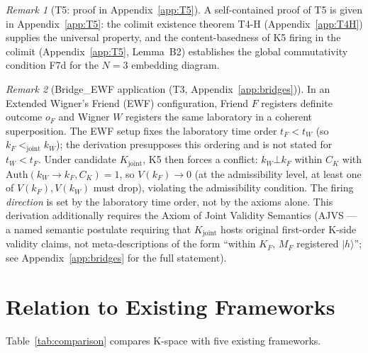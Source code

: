 \documentclass[12pt,a4paper]{article}
\theoremstyle{plain}
\theoremstyle{definition}
\theoremstyle{remark}
\newtheorem{remark}{Remark}[section]
\newcommand{\Kjoint}{K_{\mathrm{joint}}}
\newcommand{\CK}{C_K}
\newcommand{\Auth}{\mathrm{Auth}}
\begin{document}
\begin{remark}[T5: proof in Appendix~\ref{app:T5}]
A self-contained proof of T5 is given in Appendix~\ref{app:T5}: the colimit
existence theorem T4-H (Appendix~\ref{app:T4H}) supplies the universal
property, and the content-basedness of K5 firing in the colimit
(Appendix~\ref{app:T5}, Lemma~B2) establishes the global commutativity
condition F7d for the $N=3$ embedding diagram.
\end{remark}

\begin{remark}[Bridge\_EWF application (T3, Appendix~\ref{app:bridges})]
In an Extended Wigner's Friend (EWF) configuration, Friend $F$ registers
definite outcome $o_F$ and Wigner $W$ registers the same laboratory in a
coherent superposition. The EWF setup fixes the laboratory time order
$t_F < t_W$ (so $k_F <_{\mathrm{joint}} k_W$); the derivation presupposes this
ordering and is not stated for $t_W < t_F$. Under candidate $\Kjoint$, K5 then
forces a conflict: $k_W \bot k_F$ within $\CK$ with $\Auth(k_W\to k_F, \CK)=1$,
so $V(k_F)\to 0$ (at the admissibility level, at least one of $V(k_F), V(k_W)$
must drop), violating the admissibility condition. The firing \emph{direction}
is set by the laboratory time order, not by the axioms alone. This derivation
additionally requires the Axiom of Joint
Validity Semantics (AJVS --- a named semantic postulate requiring that
$\Kjoint$ hosts original first-order K-side validity claims, not
meta-descriptions of the form ``within $K_F$, $M_F$ registered $|h\rangle$'';
see Appendix~\ref{app:bridges} for the full statement).
\end{remark}

\section{Relation to Existing Frameworks}
\label{sec:comparison}

Table~\ref{tab:comparison} compares K-space with five existing frameworks.
\end{document}
